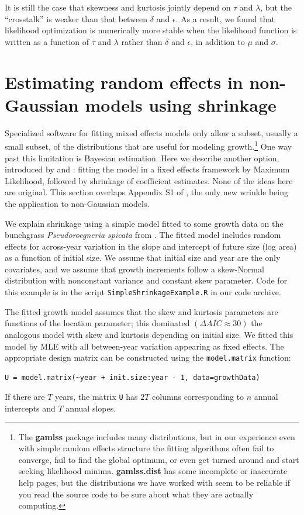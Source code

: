 \documentclass[12pt]{article}
\begin{document}
It is still the case that skewness and kurtosis jointly depend on $\tau$ and $\lambda$, but the
``crosstalk'' is weaker than that between $\delta$ and $\epsilon$. 
As a result, we found that likelihood optimization is numerically more stable when the likelihood function is 
written as a function of $\tau$ and $\lambda$ rather than $\delta$ and $\epsilon$, in addition to $\mu$ and $\sigma$.  

\section{Estimating random effects in non-Gaussian models using shrinkage}
\label{sec:shrinkageFits}
Specialized software for fitting mixed effects models only allow a subset, usually a small subset, of the distributions that 
are useful for modeling growth.\footnote{The \textbf{gamlss} package includes many distributions, but in our experience even with 
simple random effects structure the fitting algorithms often fail to converge, fail to find the global optimum, or   
even get turned around and start seeking likelihood minima. 
\textbf{gamlss.dist} has some incomplete or inaccurate help pages, 
but the distributions we have worked with seem to be reliable if you read the source code to be sure about what they are
actually computing.} One way past this limitation is Bayesian estimation. Here we describe another option, 
introduced by \citet{link-nichols-1994} and \citet{gould-nichols-1998}: 
fitting the model in a fixed effects framework by Maximum Likelihood, followed by shrinkage of coefficient estimates. 
None of the ideas here are original. This section overlaps Appendix S1 of \citet{metcalf-etal-2015}, the only new wrinkle
being the application to non-Gaussian models.

We explain shrinkage using a simple model fitted to some growth data 
on the bunchgrass \emph{Pseudoroegneria spicata} from \cite{adler-weak-dryad}. 
The fitted model includes random effects for across-year variation in the slope and 
intercept of future size (log area) as a function of initial size. We assume that initial size 
and year are the only covariates, and we assume that growth increments 
follow a skew-Normal distribution with nonconstant variance and constant skew parameter. 
Code for this example is in the script \texttt{SimpleShrinkageExample.R} in our code archive. 

The fitted growth model assumes that the skew and kurtosis parameters are functions
of the location parameter; this dominated $(\Delta AIC \approx 30)$ the analogous  
model with skew and kurtosis depending on initial size.   
We fitted this model by MLE with all between-year variation appearing as fixed effects. 
The appropriate design matrix can be constructed using the \texttt{model.matrix} function: 
\begin{lstlisting}
U = model.matrix(~year + init.size:year - 1, data=growthData)
\end{lstlisting}
If there are $T$ years, the matrix \texttt{U} has $2T$ columns corresponding to $n$ annual 
intercepts and $T$ annual slopes. 
\end{document}
